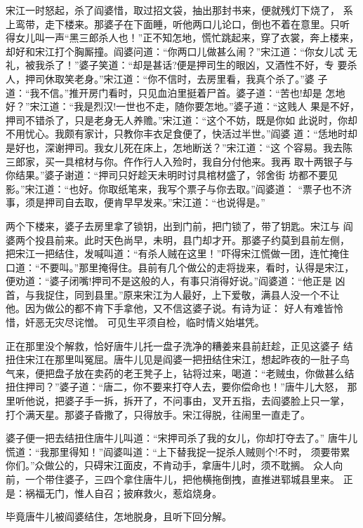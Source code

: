 宋江一时怒起，杀了阎婆惜，取过招文袋，抽出那封书来，便就残灯下烧了，
系上鸾带，走下楼来。那婆子在下面睡，听他两口儿论口，倒也不着在意里。只听
得女儿叫一声“黑三郎杀人也！”正不知怎地，慌忙跳起来，穿了衣裳，奔上楼来，
却好和宋江打个胸厮撞。阎婆问道：“你两口儿做甚么闹？”宋江道：“你女儿忒
无礼，被我杀了！”婆子笑道：“却是甚话?便是押司生的眼凶，又酒性不好，专
要杀人，押司休取笑老身。”宋江道：“你不信时，去房里看，我真个杀了。”婆
子道：“我不信。”推开房门看时，只见血泊里挺着尸首。婆子道：“苦也!却是
怎地好？”宋江道：“我是烈汉!一世也不走，随你要怎地。”婆子道：“这贱人
果是不好，押司不错杀了，只是老身无人养赡。”宋江道：“这个不妨，既是你如
此说时，你却不用忧心。我颇有家计，只教你丰衣足食便了，快活过半世。”阎婆
道：“恁地时却是好也，深谢押司。我女儿死在床上，怎地断送？”宋江道：“这
个容易。我去陈三郎家，买一具棺材与你。仵作行人入殓时，我自分付他来。我再
取十两银子与你结果。”婆子谢道：“押司只好趁天未明时讨具棺材盛了，邻舍街
坊都不要见影。”宋江道：“也好。你取纸笔来，我写个票子与你去取。”阎婆道：
“票子也不济事，须是押司自去取，便肯早早发来。”宋江道：“也说得是。”

两个下楼来，婆子去房里拿了锁钥，出到门前，把门锁了，带了钥匙。宋江与
阎婆两个投县前来。此时天色尚早，未明，县门却才开。那婆子约莫到县前左侧，
把宋江一把结住，发喊叫道：“有杀人贼在这里！”吓得宋江慌做一团，连忙掩住
口道：“不要叫。”那里掩得住。县前有几个做公的走将拢来，看时，认得是宋江，
便劝道：“婆子闭嘴!押司不是这般的人，有事只消得好说。”阎婆道：“他正是
凶首，与我捉住，同到县里。”原来宋江为人最好，上下爱敬，满县人没一个不让
他。因为做公的都不肯下手拿他，又不信这婆子说。有诗为证：
好人有难皆怜惜，奸恶无灾尽诧憎。
可见生平须自检，临时情义始堪凭。

正在那里没个解救，恰好唐牛儿托一盘子洗净的糟姜来县前赶趁，正见这婆子
结扭住宋江在那里叫冤屈。唐牛儿见是阎婆一把扭结住宋江，想起昨夜的一肚子鸟
气来，便把盘子放在卖药的老王凳子上，钻将过来，喝道：“老贼虫，你做甚么结
扭住押司？”婆子道：“唐二，你不要来打夺人去，要你偿命也！”唐牛儿大怒，
那里听他说，把婆子手一拆，拆开了，不问事由，叉开五指，去阎婆脸上只一掌，
打个满天星。那婆子昏撒了，只得放手。宋江得脱，往闹里一直走了。

婆子便一把去结扭住唐牛儿叫道：“宋押司杀了我的女儿，你却打夺去了。”
唐牛儿慌道：“我那里得知！”阎婆叫道：“上下替我捉一捉杀人贼则个!不时，
须要带累你们。”众做公的，只碍宋江面皮，不肯动手，拿唐牛儿时，须不耽搁。
众人向前，一个带住婆子，三四个拿住唐牛儿，把他横拖倒拽，直推进郓城县里来。
正是：祸福无门，惟人自召；披麻救火，惹焰烧身。

毕竟唐牛儿被阎婆结住，怎地脱身，且听下回分解。